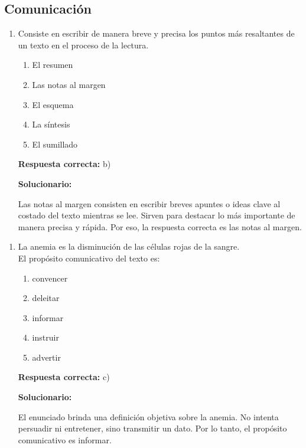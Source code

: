 \subsection*{Comunicación}

\begin{enumerate}[resume]
	
	\item Consiste en escribir de manera breve y precisa los puntos más resaltantes de un texto en el proceso de la lectura.
	
	\begin{enumerate}[label=\alph*)]
		\item El resumen
		\item Las notas al margen
		\item El esquema
		\item La síntesis
		\item El sumillado
	\end{enumerate}
	
	\textbf{Respuesta correcta:} b)
	
	\vspace{2mm}
	\textbf{Solucionario:}
	
	Las notas al margen consisten en escribir breves apuntes o ideas clave al costado del texto mientras se lee. Sirven para destacar lo más importante de manera precisa y rápida. Por eso, la respuesta correcta es las notas al margen.
	
\end{enumerate}

\begin{enumerate}[resume]
	
	\item La anemia es la disminución de las células rojas de la sangre.\\
	El propósito comunicativo del texto es:
	
	\begin{enumerate}[label=\alph*)]
		\item convencer
		\item deleitar
		\item informar
		\item instruir
		\item advertir
	\end{enumerate}
	
	\textbf{Respuesta correcta:} c)
	
	\vspace{2mm}
	\textbf{Solucionario:}
	
	El enunciado brinda una definición objetiva sobre la anemia. No intenta persuadir ni entretener, sino transmitir un dato. Por lo tanto, el propósito comunicativo es informar.
	
\end{enumerate}

